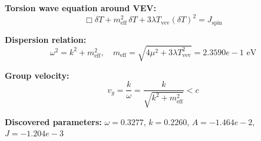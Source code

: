 
\textbf{Torsion wave equation around VEV:}
\begin{equation}
  \Box \delta T + m_{\text{eff}}^2 \, \delta T + 3\lambda T_{\text{vev}} (\delta T)^2 = J_{\text{spin}}
\end{equation}

\textbf{Dispersion relation:}
\begin{equation}
  \omega^2 = k^2 + m_{\text{eff}}^2, \quad
  m_{\text{eff}} = \sqrt{4\mu^2 + 3\lambda T_{\text{vev}}^2} = 2.3590e-1 \text{ eV}
\end{equation}

\textbf{Group velocity:}
\begin{equation}
  v_g = \frac{k}{\omega} = \frac{k}{\sqrt{k^2 + m_{\text{eff}}^2}} < c
\end{equation}

\textbf{Discovered parameters:}
$\omega = 0.3277$, \quad
$k = 0.2260$, \quad
$A = -1.464e-2$, \quad
$J = -1.204e-3$